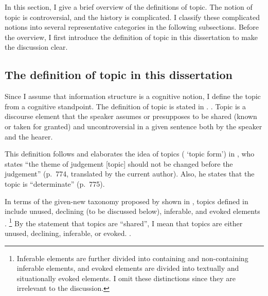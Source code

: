 In this section, I give a brief overview of the definitions of topic.
The notion of topic is controversial, and the history is complicated.
I classify these complicated notions into several representative categories in the following subsections.
Before the overview, I first introduce the definition of topic in this dissertation to make the discussion clear.

\subsection{The definition of topic in this dissertation}\label{BackSubsecDefTopic}





Since I assume that information structure is a cognitive notion, I define the topic from a cognitive standpoint.
The definition of topic is stated in \Next.
%
\ex. \label{BackDefTopic} Topic is a discourse element that the speaker assumes or presupposes to be shared (known or taken for granted) and uncontroversial in a given sentence both by the speaker and the hearer.

This definition follows and elaborates the idea of topics ( `topic form') in ,
who states ``the theme of judgement [topic] should not be changed before the judgement'' (p.~774, translated by the current author).
Also, he states that the topic is ``determinate'' (p.~775).

In terms of the given-new taxonomy proposed by  shown in \Next,
topics defined in \Last include unused, declining (to be discussed below), inferable, and evoked elements \cite[\S 4.4.2]{lambrecht94}.%
 \footnote{
 Inferable elements are further divided into containing and non-containing inferable elements, and
 evoked elements are divided into textually and situationally evoked elements.
 I omit these distinctions since they are irrelevant to the discussion.
 }
%
By the statement that topics are ``shared'',
I mean that topics are either unused, declining, inferable, or evoked.
\vspace{0.5cm}
%
\ex.\label{Back:Top:DefTop:GNTaxonomy}

